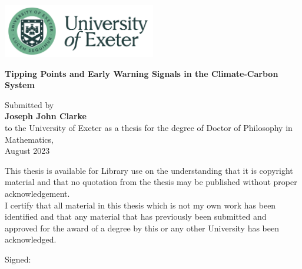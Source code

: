\graphicspath{{figs/}}
\begin{titlepage}
  \begin{onehalfspace}
    \begin{center}
      {
        \sffamily
        \vspace{1cm}
        \includegraphics[width=0.5\textwidth]{Exeter_logo.png}
        \Huge
        
        \vspace*{1.5cm}
        \textbf{Tipping Points and Early Warning Signals in the Climate-Carbon System}
        \vspace{2cm}
        \large


        Submitted by\\
        \textbf{Joseph John Clarke}\\
        to the University of Exeter as a thesis for the degree of Doctor of Philosophy in Mathematics,\\
        August 2023

        \vspace{2cm}
        \normalsize
        This thesis is available for Library use on the understanding that it is copyright
	material and that no quotation from the thesis may be published without proper
	acknowledgement.\\
	\vspace{1cm}
	I certify that all material in this thesis which is not my own work has been identified
	and that any material that has previously been submitted and approved for the award
	of a degree by this or any other University has been acknowledged.
	
	
	\vspace{1cm}
	Signed: \dotfill
        }
      \end{center}
    \end{onehalfspace}
  \end{titlepage}
\restoregeometry%